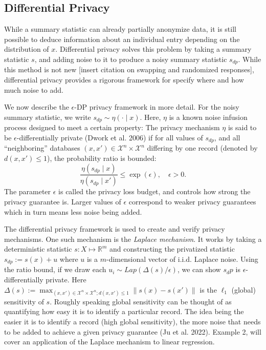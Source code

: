 \hypertarget{differential-privacy}{%
\subsection{Differential Privacy}\label{differential-privacy}}

While a summary statistic can already partially anonymize data, it is still
possible to deduce information about an individual entry depending on
the distribution of \(x\). Differential privacy
solves this problem by taking a summary statistic \(s\), and adding noise to it to produce a noisy summary statistic \(s_{dp}\).
While this method is not new {[}insert citation on swapping and randomized responses{]}, differential privacy
provides a rigorous framework for specify where and how much
noise to add.

We now describe the \(\epsilon\)-DP privacy framework in more detail. For the noisy summary
statistic, we write \(s_{dp} \sim \eta(\cdot \mid x)\). Here,
\(\eta\) is a known noise infusion process designed to meet a certain property: The privacy mechanism
\(\eta\) is said to be \(\epsilon\)-differentially private (Dwork et al. 2006) if for all values of
\(s_{dp}\), and all ``neighboring'' databases \((x,x') \in \mathcal{X}^n \times \mathcal{X}^n\) differing
by one record (denoted by \(d(x,x') \leq 1\)), the probability ratio is bounded:
\[
\dfrac{\eta(s_{dp} \mid x)}{\eta(s_{dp} \mid x')} \leq \exp(\epsilon), \quad \epsilon > 0.
\]
The parameter \(\epsilon\) is called the privacy loss budget, and controls how
strong the privacy guarantee is. Larger values of \(\epsilon\) correspond to weaker
privacy guarantees which in turn means less noise being added.

The differential privacy framework is used to create and verify privacy
mechanisms. One such mechanism is the \emph{Laplace mechanism}. It works by
taking a deterministic statistic \(s: X \mapsto \mathbb{R}^m\) and constructing
the privatized statistic \(s_{dp} := s(x) + u\) where \(u\) is a \(m\)-dimensional
vector of i.i.d. Laplace noise. Using the ratio bound, if we draw
each \(u_i \sim Lap(\Delta (s) / \epsilon)\), we can show \(s_dp\) is \(\epsilon\)-differentially private.
Here \(\Delta (s) := \max_{(x,x') \in \mathcal{X}^n \times \mathcal{X}^n; d(x,x') \leq 1} \|s(x) - s(x')\|\)
is the \(\ell_1\) (global) sensitivity of \(s\). Roughly speaking
global sensitivity can be thought of as quantifying how easy it is to identify
a particular record. The idea being the easier it is to identify a record (high global sensitivity),
the more noise that needs to be added to achieve a given privacy guarantee (Ju et al. 2022). Example 2, will cover an
application of the Laplace mechanism to linear regression.

